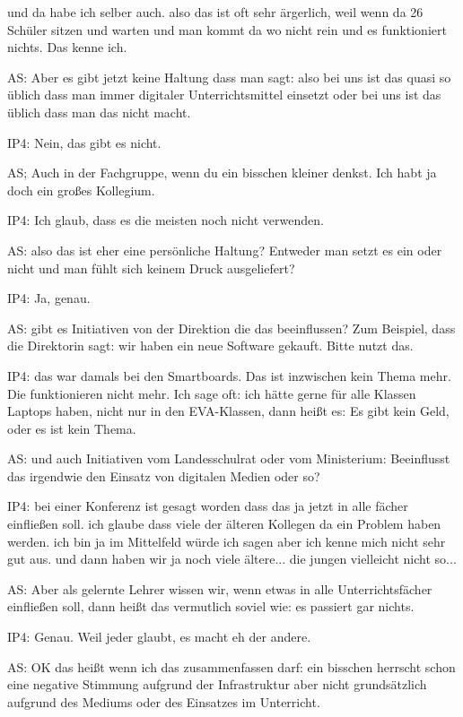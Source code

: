 \documentclass[fontsize=11pt,paper=a4]{scrbook}
\begin{document}
{\begin{itemize*}
und da habe ich selber auch.
also das ist oft sehr ärgerlich, weil wenn da 26 Schüler sitzen
und warten und man kommt da wo nicht rein und es
funktioniert nichts. Das kenne ich.
\item[AS:]
 Aber es gibt jetzt keine
Haltung dass man sagt: also bei uns ist
das quasi so üblich dass man immer
digitaler Unterrichtsmittel einsetzt oder bei uns ist das
üblich dass man das nicht macht.
\item[IP4:] Nein, das gibt es nicht.
\item[AS;] Auch in der Fachgruppe, wenn du ein bisschen kleiner denkst. Ich habt ja doch ein großes Kollegium.
\item[IP4:] Ich glaub, dass es die meisten noch nicht verwenden.
\item[AS:]
also das ist eher eine persönliche
Haltung? Entweder man setzt es ein oder nicht und man fühlt sich keinem Druck ausgeliefert?
\item[IP4:] Ja, genau.
\item[AS:] gibt es Initiativen
von der Direktion die das beeinflussen? Zum Beispiel, dass die Direktorin sagt: wir haben ein neue
Software gekauft. Bitte nutzt das. 
\item[IP4:] 
 das
war damals bei den Smartboards. Das ist inzwischen kein Thema mehr. Die funktionieren nicht mehr. 
Ich sage oft: ich hätte gerne für
alle Klassen Laptops haben, nicht nur in den EVA-Klassen, dann heißt es: Es gibt kein Geld, oder es ist kein Thema.
\item[AS:] und auch
Initiativen vom Landesschulrat oder vom
Ministerium: Beeinflusst das irgendwie den Einsatz von digitalen
Medien oder so?
\item[IP4:]
bei einer Konferenz ist gesagt worden dass
das ja jetzt in alle
fächer einfließen soll.
ich glaube dass viele der älteren
Kollegen da ein Problem haben werden. ich bin
ja im Mittelfeld würde ich sagen aber ich kenne mich nicht sehr gut aus. und dann haben
wir ja noch viele ältere... die jungen vielleicht nicht so...
\item[AS:]  Aber als gelernte Lehrer wissen wir, wenn etwas in alle Unterrichtsfächer einfließen soll, dann heißt das vermutlich soviel wie: es passiert gar nichts.
\item[IP4:] Genau. Weil jeder glaubt, es macht eh der andere.
\item[AS:]OK das heißt wenn ich das
zusammenfassen darf: ein bisschen
herrscht schon eine negative Stimmung
 aufgrund der Infrastruktur
aber nicht grundsätzlich aufgrund des
Mediums oder des Einsatzes im Unterricht.

\end{itemize*}}
\end{document}
